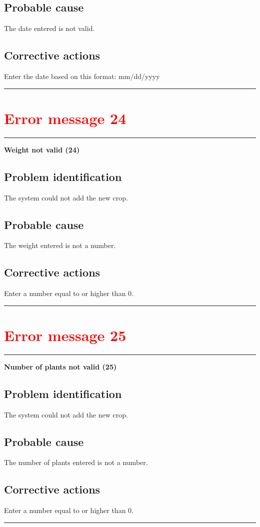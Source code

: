 \subsection{Probable cause}
The date entered is not valid.

\subsection{Corrective actions}
Enter the date based on this format: mm/dd/yyyy
\vspace{0.5cm}
\hrule
\hfill




\section{\textbf{\textcolor{red}{Error message 24}}}
\hrule
\vspace{0.5cm}
\textbf{Weight not valid (24)}
\subsection{Problem identification}
The system could not add the new crop.

\subsection{Probable cause}
The weight entered is not a number.

\subsection{Corrective actions}
Enter a number equal to or higher than 0.
\vspace{0.5cm}
\hrule
\hfill




\section{\textbf{\textcolor{red}{Error message 25}}}
\hrule
\vspace{0.5cm}
\textbf{Number of plants not valid (25)}
\subsection{Problem identification}
The system could not add the new crop.

\subsection{Probable cause}
The number of plants entered is not a number.

\subsection{Corrective actions}
Enter a number equal to or higher than 0.
\vspace{0.5cm}
\hrule
\hfill